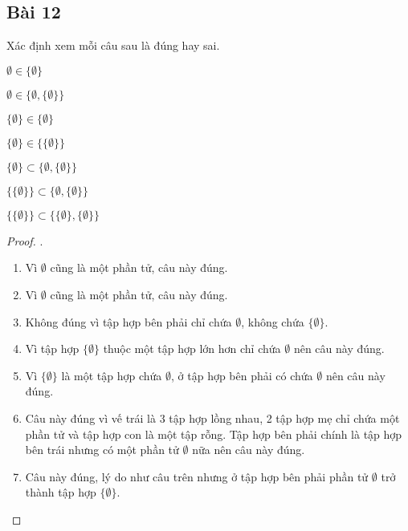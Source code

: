 \subsection*{Bài 12}
Xác định xem mỗi câu sau là đúng hay sai.
\begin{enumerate}[label=\alph*)]
    \begin{multicols}{2}
        \item $\emptyset\in\{\emptyset\}$
        \item $\emptyset\in\{\emptyset,\{\emptyset\}\}$
        \item $\{\emptyset\}\in\{\emptyset\}$
        \item $\{\emptyset\}\in\{\{\emptyset\}\}$
        \item $\{\emptyset\}\subset\{\emptyset,\{\emptyset\}\}$
        \item $\{\{\emptyset\}\}\subset\{\emptyset,\{\emptyset\}\}$
        \item $\{\{\emptyset\}\}\subset\{\{\emptyset\},\{\emptyset\}\}$
    \end{multicols}
\end{enumerate}
\begin{proof}.
    \begin{enumerate}[label=\alph*)]
        \item Vì $\emptyset$ cũng là một phần tử, câu này đúng.
        \item Vì $\emptyset$ cũng là một phần tử, câu này đúng.
        \item Không đúng vì tập hợp bên phải chỉ chứa $\emptyset$, không chứa $\{\emptyset\}$.
        \item Vì tập hợp $\{\emptyset\}$ thuộc một tập hợp lớn hơn chỉ chứa $\emptyset$ nên câu này đúng.
        \item Vì $\{\emptyset\}$ là một tập hợp chứa $\emptyset$, ở tập hợp bên phải có chứa $\emptyset$ nên câu này đúng.
        \item Câu này đúng vì vế trái là 3 tập hợp lồng nhau, 2 tập hợp mẹ chỉ chứa một phần tử và tập hợp con là một tập rỗng. Tập hợp bên phải chính là tập hợp bên trái nhưng có một phần tử $\emptyset$ nữa nên câu này đúng.
        \item Câu này đúng, lý do như câu trên nhưng ở tập hợp bên phải phần tử $\emptyset$ trở thành tập hợp $\{\emptyset\}$.
    \end{enumerate}
\end{proof}
